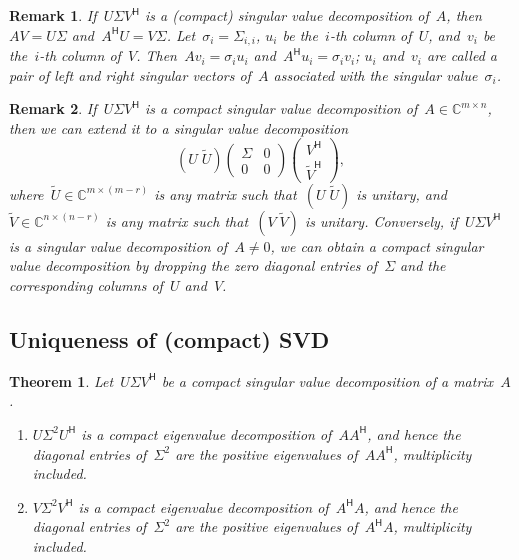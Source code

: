 \documentclass[11pt,a4paper]{article}
\newtheorem{theorem}{Theorem}%
\newtheorem{remark}{Remark}%
\theoremstyle{definition}
\def\CC{\mathbb{C}}
\newcommand{\hmt}{{\scriptscriptstyle{{\mathsf{H}}}}}
\begin{document}
\begin{remark}
If~$U\Sigma V^\hmt$ is a \textnormal{(}compact\textnormal{)} singular value decomposition 
of~$A$, then~$AV = U\Sigma$ and~$A^\hmt U = V\Sigma$.
Let~$\sigma_i=\Sigma_{i,i}$, $u_i$ be the~$i$-th column of~$U$, 
and~$v_i$ be the~$i$-th column of~$V$. 
Then~$A v_i = \sigma_i u_i$ and~$A^\hmt u_i = \sigma_i v_i$; $u_i$ and~$v_i$ 
are called a pair of left and right singular vectors of~$A$ associated with the 
singular value~$\sigma_{i}$. 
\end{remark}

\begin{remark}
  If~$U \Sigma V^\hmt$ is a compact singular value decomposition of~$A \in \CC^{m\times n}$, 
  then we can extend it to a singular value decomposition
  \begin{equation*}
    (U \; \tilde{U}) 
    \begin{pmatrix}
      \Sigma & 0\\
      0 & 0
    \end{pmatrix}
    \begin{pmatrix}
      V^\hmt\\
      \tilde{V}^\hmt 
    \end{pmatrix},
  \end{equation*}
  where~$\tilde{U}\in \CC^{m\times(m-r)}$ is any matrix such that~$(U \; \tilde{U})$ is unitary,
  and~$\tilde{V} \in \CC^{n\times (n-r)}$ is any matrix such that~$(V \; \tilde{V})$ is unitary.
  Conversely, if~$U\Sigma V^\hmt$ is a singular value decomposition of~$A\neq 0$, we can obtain a compact
  singular value decomposition by dropping the zero diagonal entries of~$\Sigma$ and the
  corresponding columns of~$U$ and~$V$. 
\end{remark}

\subsection{Uniqueness of (compact) SVD}

\begin{theorem}
 Let~$U\Sigma V^\hmt$ be a compact singular value decomposition of a matrix~$A$.
 \begin{enumerate}[leftmargin=1.5em]
   \item $U\Sigma^2 U^\hmt$ is a compact eigenvalue decomposition of~$AA^\hmt$, 
     and hence the diagonal entries of~$\Sigma^2$ are the positive eigenvalues of~$AA^\hmt$, multiplicity included. 
   \item $V\Sigma^2 V^\hmt$ is a compact eigenvalue decomposition of~$A^\hmt A$,
     and hence the diagonal entries of~$\Sigma^2$ are the positive eigenvalues of~$A^\hmt A$, multiplicity included. 
 \end{enumerate}
\end{theorem}
\end{document}
